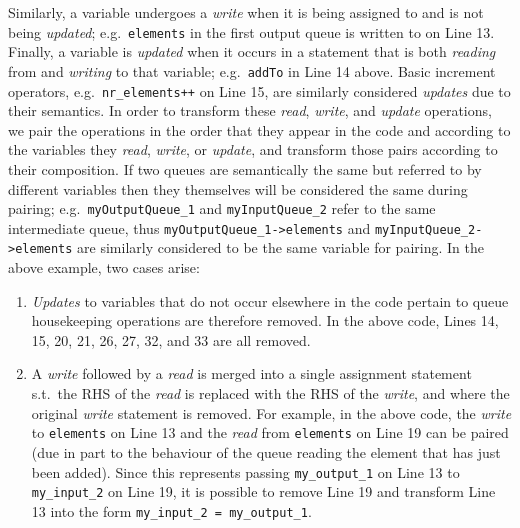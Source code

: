 %
Similarly, a variable undergoes a \emph{write} when it is being assigned to and is not being \emph{updated}; e.g.\ \lstinline|elements|
in the first output queue is written to on Line 13.
%
Finally, a variable is \emph{updated} when it occurs in a statement that is both \emph{reading} from and \emph{writing} to that variable; e.g.\  \lstinline|addTo| in Line 14 above. Basic increment operators, e.g.\  \lstinline|nr_elements++| on Line 15, are similarly considered \emph{updates} due to their semantics.
%
%
In order to transform these \emph{read}, \emph{write}, and \emph{update} operations, we pair the operations in the order that they appear in the code and according to the variables they \emph{read}, \emph{write}, or \emph{update}, and transform those pairs according to their composition.
%
If two queues are semantically the same but referred to by different variables then they themselves will be considered the same during pairing; e.g.\ \lstinline|myOutputQueue_1| and \lstinline|myInputQueue_2| refer to the same intermediate queue, thus \lstinline|myOutputQueue_1->elements| and \lstinline|myInputQueue_2->elements| are similarly considered to be the same variable for pairing.
%
In the above example, two cases arise:
%
\begin{enumerate}
\item \emph{Updates} to variables that do not occur elsewhere in the code pertain to queue housekeeping operations are therefore removed.
%
In the above code, Lines 14, 15, 20, 21, 26, 27, 32, and 33 are all removed.


\item A \emph{write} followed by a \emph{read} is merged into a single assignment statement s.t.\ the RHS of the \emph{read} is replaced with the RHS of the \emph{write}, and where the original \emph{write} statement is removed.
%
For example, in the above code, the \emph{write} to \lstinline|elements| on Line 13 and the \emph{read} from \lstinline|elements| on Line 19 can be paired (due in part to the behaviour of the queue reading the element that has just been added). Since this represents passing \lstinline|my_output_1| on Line 13 to \lstinline|my_input_2| on Line 19, it is possible to remove Line 19 and transform Line 13 into the form \lstinline|my_input_2 = my_output_1|.
%
\end{enumerate}
